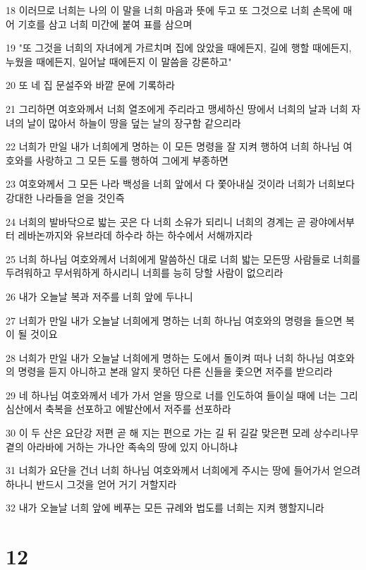 \par 18 이러므로 너희는 나의 이 말을 너희 마음과 뜻에 두고 또 그것으로 너희 손목에 매어 기호를 삼고 너희 미간에 붙여 표를 삼으며
\par 19 "또 그것을 너희의 자녀에게 가르치며 집에 앉았을 때에든지, 길에 행할 때에든지, 누웠을 때에든지, 일어날 때에든지 이 말씀을 강론하고"
\par 20 또 네 집 문설주와 바깥 문에 기록하라
\par 21 그리하면 여호와께서 너희 열조에게 주리라고 맹세하신 땅에서 너희의 날과 너희 자녀의 날이 많아서 하늘이 땅을 덮는 날의 장구함 같으리라
\par 22 너희가 만일 내가 너희에게 명하는 이 모든 명령을 잘 지켜 행하여 너희 하나님 여호와를 사랑하고 그 모든 도를 행하여 그에게 부종하면
\par 23 여호와께서 그 모든 나라 백성을 너희 앞에서 다 쫓아내실 것이라 너희가 너희보다 강대한 나라들을 얻을 것인즉
\par 24 너희의 발바닥으로 밟는 곳은 다 너희 소유가 되리니 너희의 경계는 곧 광야에서부터 레바논까지와 유브라데 하수라 하는 하수에서 서해까지라
\par 25 너희 하나님 여호와께서 너희에게 말씀하신 대로 너희 밟는 모든땅 사람들로 너희를 두려워하고 무서워하게 하시리니 너희를 능히 당할 사람이 없으리라
\par 26 내가 오늘날 복과 저주를 너희 앞에 두나니
\par 27 너희가 만일 내가 오늘날 너희에게 명하는 너희 하나님 여호와의 명령을 들으면 복이 될 것이요
\par 28 너희가 만일 내가 오늘날 너희에게 명하는 도에서 돌이켜 떠나 너희 하나님 여호와의 명령을 듣지 아니하고 본래 알지 못하던 다른 신들을 좇으면 저주를 받으리라
\par 29 네 하나님 여호와께서 네가 가서 얻을 땅으로 너를 인도하여 들이실 때에 너는 그리심산에서 축복을 선포하고 에발산에서 저주를 선포하라
\par 30 이 두 산은 요단강 저편 곧 해 지는 편으로 가는 길 뒤 길갈 맞은편 모레 상수리나무 곁의 아라바에 거하는 가나안 족속의 땅에 있지 아니하냐
\par 31 너희가 요단을 건너 너희 하나님 여호와께서 너희에게 주시는 땅에 들어가서 얻으려 하나니 반드시 그것을 얻어 거기 거할지라
\par 32 내가 오늘날 너희 앞에 베푸는 모든 규례와 법도를 너희는 지켜 행할지니라

\chapter{12}


